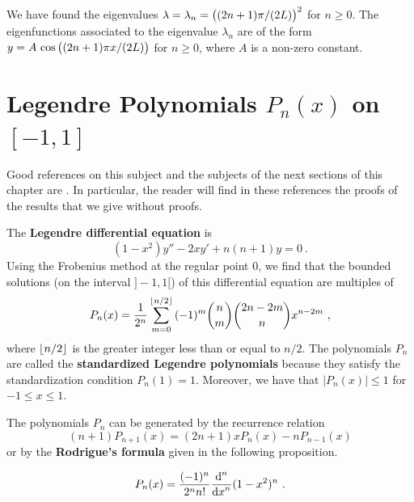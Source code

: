 \begin{egg}
We have found the eigenvalues
$\DS \lambda = \lambda_n = \big( (2n+1)\pi/(2L) \big)^2$
for $n \geq 0$.  The eigenfunctions associated to the
eigenvalue $\lambda_n$ are of the form
$\DS y = A \, \cos\big((2n+1)\pi x/ (2L) \big)$
for $n \geq 0$, where $A$ is a non-zero constant.
\end{egg}

\section{Legendre Polynomials $P_n(x)$ on $[-1,1]$}
\label{SectLegendrePoly}

Good references on this subject and the subjects of the next sections
of this chapter are \cite{Rain,Simm}.  In particular, the reader will
find in these references the proofs of the results that we give
without proofs.

The {\bfseries Legendre differential equation} is
\begin{equation} \label{spv_leg_equ}
(1-x^2)y'' -2xy' + n(n+1) y = 0 \ .
\end{equation}
Using the Frobenius method at the regular point $0$, we find that the
bounded solutions (on the interval $]-1,1[$) of this differential
equation are multiples of
\[
P_n(x) = \frac{1}{2^n} \sum_{m=0}^{\intpt{n/2}} \, (-1)^m \binom{n}{m}
\binom{2n-2m}{n} x^{n-2m} \ ,
\]
where $\intpt{n/2}$ is the greater integer less than or equal to $n/2$.
The polynomials $P_n$ are called the
{\bfseries standardized Legendre polynomials} because they satisfy the standardization
condition $P_n(1) = 1$.  Moreover, we have that $|P_n(x)| \leq 1$ for
$-1 \leq x \leq 1$.

The polynomials $P_n$ can be generated by the recurrence relation
\[
(n+1) P_{n+1}(x) = (2n+1) x P_n(x) - n P_{n-1}(x)
\]
or by the {\bfseries Rodrigue's formula} given in the following proposition.

\begin{prop}
\[
P_n(x) = \frac{(-1)^n}{2^n n!} \dfdxn{(1-x^2)^n}{x}{n} \ .
\]
\end{prop}

